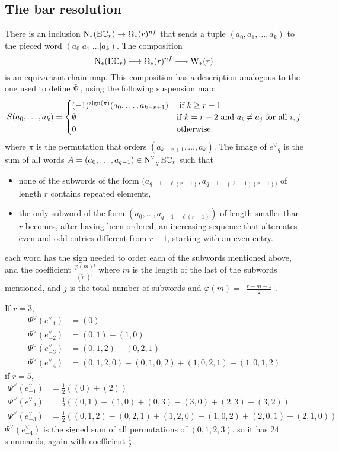 
\subsection{The bar resolution}\label{ss:milnor}
There is an inclusion $\chains(\EC_r) \to \Omega_*(r)^{\nf}$ that sends a tuple $(a_0,a_1,\dots,a_k)$ to the pieced word $(a_0|a_1|\dots|a_k)$. The composition
\[
\chains(\EC_r) \lra \Omega_*(r)^{\nf} \lra \rW(r)
\]
is an equivariant chain map. This composition has a description analogous to the one used to define $\Psiom$, using the following suspension map:
\[
S(a_0,\dots,a_k) = \begin{cases}
	(-1)^{\sign{\perm}} (a_{0},\dots,a_{k-r+1}) & \text{ if $k \geq r-1$} \\
	\emptyset & \text{if $k = r-2$ and $a_i\neq a_j$ for all $i,j$} \\
	0 & \text{otherwise.}
\end{cases}
\]
where $\pi$ is the permutation that orders $(a_{k-r+1},\dots,a_{k})$. The image of $e_{-q}^{\vee}$ is the sum of all words $A = (a_0,\dots,a_{q-1})\in \cochains[-q] \EC_r$ such that
\begin{itemize}
\item none of the subwords of the form $(a_{q-1-\ell(r-1)},a_{q-1-(\ell-1)(r-1))}$ of length $r$ contains repeated elements,
\item the only subword of the form $(a_0,\dots,a_{q-1-\ell(r-1)})$ of length smaller than $r$ becomes, after having been ordered, an increasing sequence that alternates even and odd entries different from $r-1$, starting with an even entry.
\end{itemize}
each word has the sign needed to order each of the subwords mentioned above, and the coefficient $\frac{\varphi(m)!}{(\tilde{r}!)^j}$ where $m$ is the length of the last of the subwords mentioned, and $j$ is the total number of subwords and $\varphi(m) = \lfloor\frac{r-m-1}{2}\rfloor$.
\begin{example} If $r=3$,
\begin{align*}
	\Psi^\vee(e_{-1}^\vee) &= (0)
	\\
	\Psi^\vee(e_{-2}^{\vee}) &= (0,1)-(1,0)
	\\
	\Psi^\vee(e_{-3}^{\vee}) &= (0,1,2) - (0,2,1)
\\
	\Psi^\vee(e_{-4}^{\vee}) &= (0,1,2,0) - (0,1,0,2) + (1,0,2,1) - (1,0,1,2)
\end{align*}
if $r= 5$,
\begin{align*}
	\Psi^\vee(e^\vee_{-1}) &= \frac{1}{2}\left((0) + (2)\right)
	\\
	\Psi^\vee(e^\vee_{-2}) &= \frac{1}{2}\left((0,1) - (1,0) + (0,3) - (3,0) + (2,3) + (3,2)\right)
	\\
	\Psi^\vee(e^\vee_{-3}) &= \frac{1}{2}\left((0,1,2) -(0,2,1) + (1,2,0) - (1,0,2) + (2,0,1) - (2,1,0)\right)
\end{align*}
$\Psi^\vee(e^\vee_{-4})$ is the signed sum of all permutations of $(0,1,2,3)$, so it has $24$ summands, again with coefficient $\frac{1}{2}$.
\end{example}

